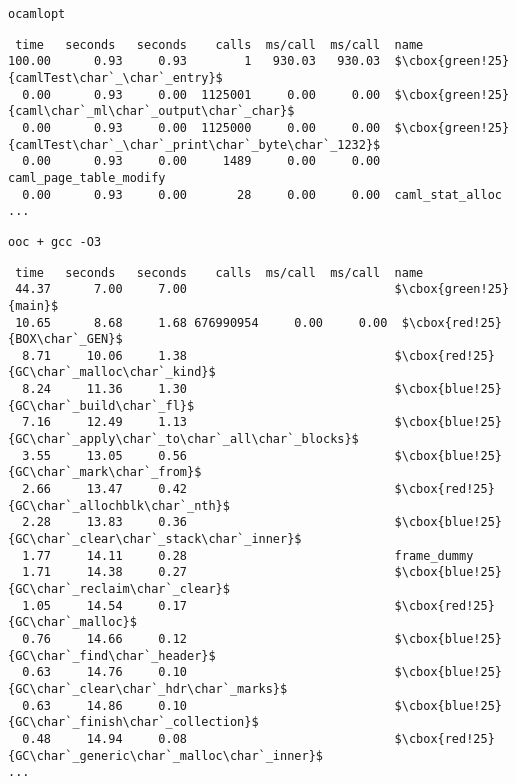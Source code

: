 \texttt{ocamlopt}
\begin{lstlisting}[basicstyle=\ttfamily\footnotesize,
basewidth={.5em,.3em}, frame=single]
  %   cumulative   self              self     total           
 time   seconds   seconds    calls  ms/call  ms/call  name    
100.00      0.93     0.93        1   930.03   930.03  $\cbox{green!25}{camlTest\char`_\char`_entry}$
  0.00      0.93     0.00  1125001     0.00     0.00  $\cbox{green!25}{caml\char`_ml\char`_output\char`_char}$
  0.00      0.93     0.00  1125000     0.00     0.00  $\cbox{green!25}{camlTest\char`_\char`_print\char`_byte\char`_1232}$
  0.00      0.93     0.00     1489     0.00     0.00  caml_page_table_modify
  0.00      0.93     0.00       28     0.00     0.00  caml_stat_alloc
...
\end{lstlisting}
\texttt{ooc + gcc -O3}
\begin{lstlisting}[basicstyle=\ttfamily\footnotesize,
basewidth={.5em,.3em}, frame=single]
  %   cumulative   self              self     total           
 time   seconds   seconds    calls  ms/call  ms/call  name    
 44.37      7.00     7.00                             $\cbox{green!25}{main}$
 10.65      8.68     1.68 676990954     0.00     0.00  $\cbox{red!25}{BOX\char`_GEN}$
  8.71     10.06     1.38                             $\cbox{red!25}{GC\char`_malloc\char`_kind}$
  8.24     11.36     1.30                             $\cbox{blue!25}{GC\char`_build\char`_fl}$
  7.16     12.49     1.13                             $\cbox{blue!25}{GC\char`_apply\char`_to\char`_all\char`_blocks}$
  3.55     13.05     0.56                             $\cbox{blue!25}{GC\char`_mark\char`_from}$
  2.66     13.47     0.42                             $\cbox{red!25}{GC\char`_allochblk\char`_nth}$
  2.28     13.83     0.36                             $\cbox{blue!25}{GC\char`_clear\char`_stack\char`_inner}$
  1.77     14.11     0.28                             frame_dummy
  1.71     14.38     0.27                             $\cbox{blue!25}{GC\char`_reclaim\char`_clear}$
  1.05     14.54     0.17                             $\cbox{red!25}{GC\char`_malloc}$
  0.76     14.66     0.12                             $\cbox{blue!25}{GC\char`_find\char`_header}$
  0.63     14.76     0.10                             $\cbox{blue!25}{GC\char`_clear\char`_hdr\char`_marks}$
  0.63     14.86     0.10                             $\cbox{blue!25}{GC\char`_finish\char`_collection}$
  0.48     14.94     0.08                             $\cbox{red!25}{GC\char`_generic\char`_malloc\char`_inner}$
...
\end{lstlisting}
